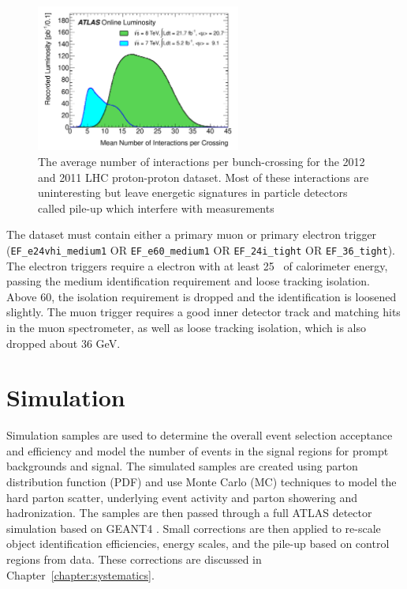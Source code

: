 \begin{figure}[!t]
\centering 
\includegraphics[width=0.60\textwidth]{figs/data/mu_2011_2012-dec.pdf}
\caption{ The average number of interactions per bunch-crossing for the 2012 and 2011 LHC proton-proton dataset. Most of these interactions are uninteresting but leave energetic signatures in particle detectors called pile-up which interfere with measurements}\label{figure:data_pileup}
\end{figure} 

The dataset must contain either a primary muon or primary electron trigger 
(\texttt{EF\_e24vhi\_medium1} OR \texttt{EF\_e60\_medium1} OR \texttt{EF\_24i\_tight} OR \texttt{EF\_36\_tight}). 
The electron triggers require a electron
with at least 25 \gev\ of calorimeter energy, passing the medium identification
requirement and loose tracking isolation.  Above 60\gev, the isolation
requirement is dropped and the identification is loosened slightly. 
The muon trigger requires a good inner detector track and matching
hits in the muon spectrometer, as well as loose tracking isolation,
which is also dropped about 36 GeV.  
            
\section{Simulation}

Simulation samples are used to determine the 
overall event selection acceptance and efficiency and model the number of events in the signal regions
for prompt backgrounds and signal. The simulated samples are created using parton distribution function (PDF) and
use Monte Carlo (MC) techniques to model the hard parton scatter, underlying event activity and parton showering and hadronization. 
The samples are then passed through a full ATLAS detector simulation\cite{Aad:2010ah} based on \textsc{GEANT4} \cite{Agostinelli:2002hh}.
Small corrections are then applied to re-scale object identification efficiencies,
energy scales, and the pile-up based on control regions from data. These corrections are discussed in Chapter~\ref{chapter:systematics}. 

